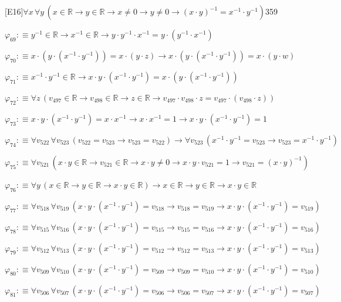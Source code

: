 \begin{fullproof}{[E16]}{$\forall x\,\forall y\,(x \in \mathbb{R} \to y \in \mathbb{R} \to x \neq 0 \to y \neq 0 \to (x \cdot y)^{-1} = x^{-1} \cdot y^{-1})$}{359}
\begin{abbrevlist}
\item $\varphi_{69} :\equiv y^{-1} \in \mathbb{R} \to x^{-1} \in \mathbb{R} \to y \cdot y^{-1} \cdot x^{-1} = y \cdot (y^{-1} \cdot x^{-1})$
\item $\varphi_{70} :\equiv x \cdot (y \cdot (x^{-1} \cdot y^{-1})) = x \cdot (y \cdot z) \to x \cdot (y \cdot (x^{-1} \cdot y^{-1})) = x \cdot (y \cdot w)$
\item $\varphi_{71} :\equiv x^{-1} \cdot y^{-1} \in \mathbb{R} \to x \cdot y \cdot (x^{-1} \cdot y^{-1}) = x \cdot (y \cdot (x^{-1} \cdot y^{-1}))$
\item $\varphi_{72} :\equiv \forall z\,(v_{497} \in \mathbb{R} \to v_{498} \in \mathbb{R} \to z \in \mathbb{R} \to v_{497} \cdot v_{498} \cdot z = v_{497} \cdot (v_{498} \cdot z))$
\item $\varphi_{73} :\equiv x \cdot y \cdot (x^{-1} \cdot y^{-1}) = x \cdot x^{-1} \to x \cdot x^{-1} = 1 \to x \cdot y \cdot (x^{-1} \cdot y^{-1}) = 1$
\item $\varphi_{74} :\equiv \forall v_{522}\,\forall v_{523}\,(v_{522} = v_{523} \to v_{523} = v_{522}) \to \forall v_{523}\,(x^{-1} \cdot y^{-1} = v_{523} \to v_{523} = x^{-1} \cdot y^{-1})$
\item $\varphi_{75} :\equiv \forall v_{521}\,(x \cdot y \in \mathbb{R} \to v_{521} \in \mathbb{R} \to x \cdot y \neq 0 \to x \cdot y \cdot v_{521} = 1 \to v_{521} = (x \cdot y)^{-1})$
\item $\varphi_{76} :\equiv \forall y\,(x \in \mathbb{R} \to y \in \mathbb{R} \to x \cdot y \in \mathbb{R}) \to x \in \mathbb{R} \to y \in \mathbb{R} \to x \cdot y \in \mathbb{R}$
\item $\varphi_{77} :\equiv \forall v_{518}\,\forall v_{519}\,(x \cdot y \cdot (x^{-1} \cdot y^{-1}) = v_{518} \to v_{518} = v_{519} \to x \cdot y \cdot (x^{-1} \cdot y^{-1}) = v_{519})$
\item $\varphi_{78} :\equiv \forall v_{515}\,\forall v_{516}\,(x \cdot y \cdot (x^{-1} \cdot y^{-1}) = v_{515} \to v_{515} = v_{516} \to x \cdot y \cdot (x^{-1} \cdot y^{-1}) = v_{516})$
\item $\varphi_{79} :\equiv \forall v_{512}\,\forall v_{513}\,(x \cdot y \cdot (x^{-1} \cdot y^{-1}) = v_{512} \to v_{512} = v_{513} \to x \cdot y \cdot (x^{-1} \cdot y^{-1}) = v_{513})$
\item $\varphi_{80} :\equiv \forall v_{509}\,\forall v_{510}\,(x \cdot y \cdot (x^{-1} \cdot y^{-1}) = v_{509} \to v_{509} = v_{510} \to x \cdot y \cdot (x^{-1} \cdot y^{-1}) = v_{510})$
\item $\varphi_{81} :\equiv \forall v_{506}\,\forall v_{507}\,(x \cdot y \cdot (x^{-1} \cdot y^{-1}) = v_{506} \to v_{506} = v_{507} \to x \cdot y \cdot (x^{-1} \cdot y^{-1}) = v_{507})$

\end{abbrevlist}
\end{fullproof}
